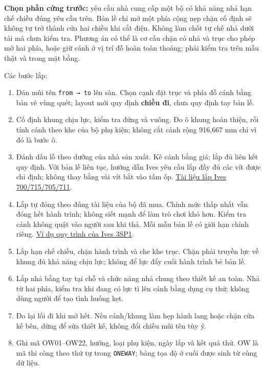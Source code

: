 \documentclass[
  11pt,
  a4paper,
]{article}
\providecommand{\tightlist}{%
  \setlength{\itemsep}{0pt}\setlength{\parskip}{0pt}}
\begin{document}
\textbf{Chọn phần cứng trước:} yêu cầu nhà cung cấp một bộ có khả năng
nhả hạn chế chiều đúng yêu cầu trên. Bản lề chỉ mở một phía cộng nẹp
chặn cố định sẽ không tự trở thành cửa hai chiều khi cắt điện. Không làm
chốt tự chế nhả dưới tải mà chưa kiểm tra. Phương án có thể là cơ cấu
chặn có nhả và trục cho phép mở hai phía, hoặc giữ cánh ở vị trí đỗ hoàn
toàn thoáng; phải kiểm tra trên mẫu thật và trong mặt bằng.

Các bước lắp:

\begin{enumerate}
\def\labelenumi{\arabic{enumi}.}
\tightlist
\item
  Dán mũi tên \texttt{from\ →\ to} lên sàn. Chọn cạnh đặt trục và phía
  đỗ cánh bằng bản vẽ vùng quét; layout mới quy định \textbf{chiều đi},
  chưa quy định tay bản lề.
\item
  Cố định khung chịu lực, kiểm tra đứng và vuông. Đo ô khung hoàn thiện,
  rồi tính cánh theo khe của bộ phụ kiện; không cắt cánh rộng 916,667 mm
  chỉ vì đó là bước ô.
\item
  Đánh dấu lỗ theo dưỡng của nhà sản xuất. Kê cánh bằng giá; lắp đủ liên
  kết quy định. Với bản lề liên tục, hướng dẫn Ives yêu cầu lắp đầy đủ
  các vít được chỉ định; không thay bằng vài vít bắt vào tấm ốp.
  \href{https://us.allegion.com/content/dam/allegion-us-2/web-files/ives/installation-documents/Ives_700_715_705_711_Continuous_Hinge_Installation_Instructions_116335.pdf}{Tài
  liệu lắp Ives 700/715/705/711}.
\item
  Lắp tự đóng theo đúng tài liệu của bộ đã mua. Chỉnh mức thấp nhất vẫn
  đóng hết hành trình; không siết mạnh để làm trò chơi khó hơn. Kiểm tra
  cánh không quật vào người sau khi thả. Mỗi mẫu bản lề có giới hạn
  chỉnh riêng.
  \href{https://us.allegion.com/content/dam/allegion-us-2/web-documents-2/InstallInstructions/Ives_3SPI_Spring_Hinge_Installation_Instructions_113960.pdf}{Ví
  dụ quy trình của Ives 3SP1}.
\item
  Lắp hạn chế chiều, chặn hành trình và che khe trục. Chặn phải truyền
  lực về khung đủ khả năng chịu lực; không để lực đẩy cuối hành trình bẻ
  bản lề.
\item
  Lắp nhả bằng tay tại chỗ và chức năng nhả chung theo thiết kế an toàn.
  Nhả từ hai phía, kiểm tra khi đang có lực tì lên cánh bằng dụng cụ
  thử; không dùng người để tạo tình huống kẹt.
\item
  Đo lại lối đi khi mở hết. Nếu cánh/khung làm hẹp hành lang hoặc chặn
  cửa kế bên, dừng để sửa thiết kế, không đổi chiều mũi tên tùy ý.
\item
  Ghi mã OW01--OW22, hướng, loại phụ kiện, ngày lắp và kết quả thử. OW
  là mã thi công theo thứ tự trong \texttt{ONEWAY}; bảng tọa độ ở cuối
  được sinh từ cùng dữ liệu.
\end{enumerate}
\end{document}
